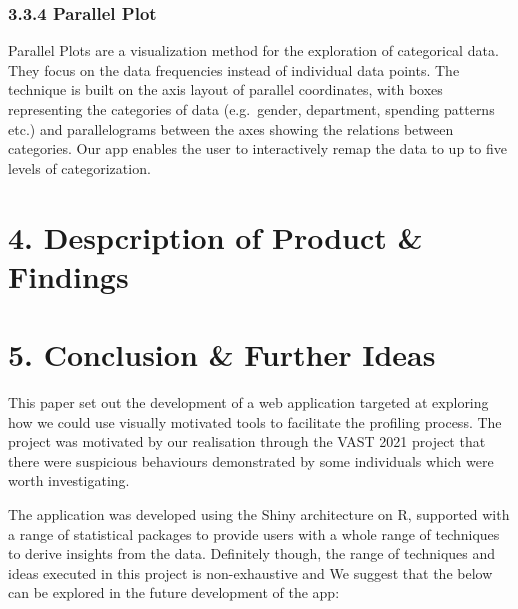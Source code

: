 \documentclass{acm_proc_article-sp}
\begin{document}
\hypertarget{parallel-plot}{%
\subsubsection{3.3.4 Parallel Plot}\label{parallel-plot}}

Parallel Plots are a visualization method for the exploration of categorical data. They focus on the data frequencies instead of individual data points. The technique is built on the axis layout of parallel coordinates, with boxes representing the categories of data (e.g.~gender, department, spending patterns etc.) and parallelograms between the axes showing the relations between categories. Our app enables the user to interactively remap the data to up to five levels of categorization.

\hypertarget{despcription-of-product-findings}{%
\section{4. Despcription of Product \& Findings}\label{despcription-of-product-findings}}

\hypertarget{conclusion-further-ideas}{%
\section{5. Conclusion \& Further Ideas}\label{conclusion-further-ideas}}

This paper set out the development of a web application targeted at exploring how we could use visually motivated tools to facilitate the profiling process. The project was motivated by our realisation through the VAST 2021 project that there were suspicious behaviours demonstrated by some individuals which were worth investigating.

The application was developed using the Shiny architecture on R, supported with a range of statistical packages to provide users with a whole range of techniques to derive insights from the data. Definitely though, the range of techniques and ideas executed in this project is non-exhaustive and We suggest that the below can be explored in the future development of the app:
\setlength{\parindent}{0in}
\end{document}
